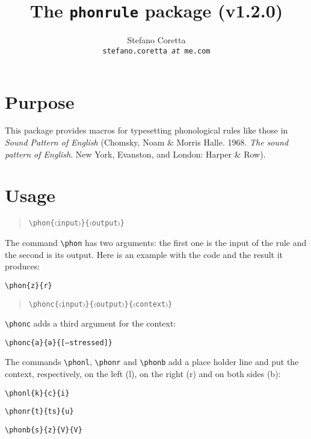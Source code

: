 \documentclass[a4paper]{article}
\title{The \texttt{phonrule} package (v1.2.0)}
\author{Stefano Coretta \\ \texttt{stefano.coretta \textit{at} me.com}}
\begin{document}
\maketitle

\section{Purpose}
This package provides macros for typesetting phonological rules like those in \textit{Sound Pattern of English} (Chomsky, Noam \& Morris Halle. 1968. \textit{The sound pattern of English}. New York, Evanston, and London: Harper \& Row).

\section{Usage}

\begin{quote}
\begin{verbatim}
\phon{〈input〉}{〈output〉}
\end{verbatim}
\end{quote}

The command \verb+\phon+ has two arguments: the first one is the input of the rule and the second is its output. Here is an example with the code and the result it produces:

\begin{exe}
\ex \verb+\phon{z}{r}+
\ex {}
\end{exe}

\begin{quote}
\begin{verbatim}
\phonc{〈input〉}{〈output〉}{〈context〉}
\end{verbatim}
\end{quote}

\verb+\phonc+ adds a third argument for the context:

\begin{exe}
\ex \verb+\phonc{a}{ə}{[–stressed]}+
\ex {}
\end{exe}

The commands \verb+\phonl+, \verb+\phonr+ and \verb+\phonb+ add a place holder line and put the context, respectively, on the left (l), on the right (r) and on both sides (b):

\begin{exe}
\ex
	\begin{xlist}
	\ex \verb+\phonl{k}{c}{i}+
	\ex {}
	\end{xlist}
\ex
	\begin{xlist}
	\ex \verb+\phonr{t}{ts}{u}+
	\ex \phonr{t}{ts}{u}
	\end{xlist}
\ex
	\begin{xlist}
	\ex \verb+\phonb{s}{z}{V}{V}+
	\ex \phonb{s}{z}{V}{V}
	\end{xlist}
\end{exe}
\end{document}
